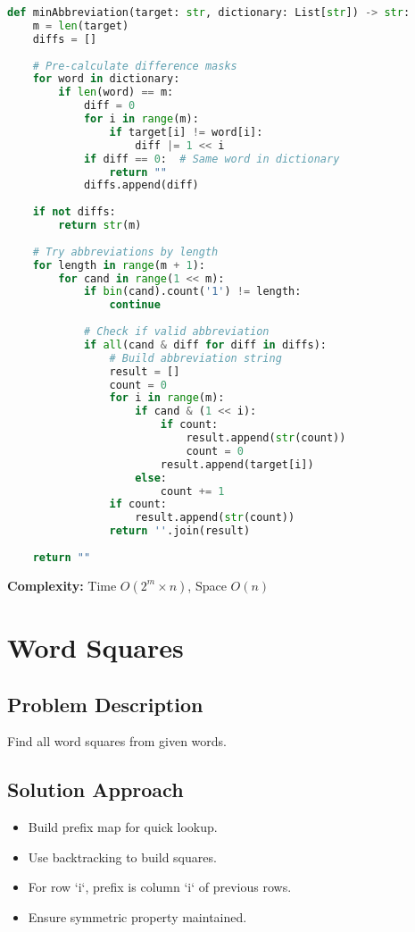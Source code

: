 \documentclass[10pt, a4paper]{article}
\begin{document}
\begin{lstlisting}[language=Python]
def minAbbreviation(target: str, dictionary: List[str]) -> str:
    m = len(target)
    diffs = []
    
    # Pre-calculate difference masks
    for word in dictionary:
        if len(word) == m:
            diff = 0
            for i in range(m):
                if target[i] != word[i]:
                    diff |= 1 << i
            if diff == 0:  # Same word in dictionary
                return ""
            diffs.append(diff)
    
    if not diffs:
        return str(m)
    
    # Try abbreviations by length
    for length in range(m + 1):
        for cand in range(1 << m):
            if bin(cand).count('1') != length:
                continue
            
            # Check if valid abbreviation
            if all(cand & diff for diff in diffs):
                # Build abbreviation string
                result = []
                count = 0
                for i in range(m):
                    if cand & (1 << i):
                        if count:
                            result.append(str(count))
                            count = 0
                        result.append(target[i])
                    else:
                        count += 1
                if count:
                    result.append(str(count))
                return ''.join(result)
    
    return ""
\end{lstlisting}
\textbf{Complexity:} Time $O(2^m \times n)$, Space $O(n)$

\section{Word Squares}
\subsection*{Problem Description}
Find all word squares from given words.

\subsection*{Solution Approach}
\begin{itemize}
    \item Build prefix map for quick lookup.
    \item Use backtracking to build squares.
    \item For row `i`, prefix is column `i` of previous rows.
    \item Ensure symmetric property maintained.
\end{itemize}
\end{document}
